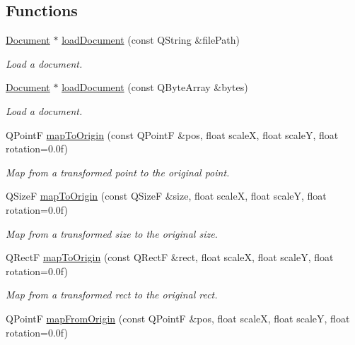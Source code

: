 \subsection*{Functions}
\begin{DoxyCompactItemize}
\item 
\hyperlink{class_mu_p_d_f_1_1_document}{Document} $\ast$ \hyperlink{namespace_mu_p_d_f_a5cf746094bc9648aca0d4a83e3ac44b3}{load\-Document} (const Q\-String \&file\-Path)
\begin{DoxyCompactList}\small\item\em Load a document. \end{DoxyCompactList}\item 
\hyperlink{class_mu_p_d_f_1_1_document}{Document} $\ast$ \hyperlink{namespace_mu_p_d_f_a294a09188a3dcab290679752dfc8d52b}{load\-Document} (const Q\-Byte\-Array \&bytes)
\begin{DoxyCompactList}\small\item\em Load a document. \end{DoxyCompactList}\item 
Q\-Point\-F \hyperlink{namespace_mu_p_d_f_a40833e5e56d0d7d44cba455e4186d5e4}{map\-To\-Origin} (const Q\-Point\-F \&pos, float scale\-X, float scale\-Y, float rotation=0.\-0f)
\begin{DoxyCompactList}\small\item\em Map from a transformed point to the original point. \end{DoxyCompactList}\item 
Q\-Size\-F \hyperlink{namespace_mu_p_d_f_ae91a73bb4e3e4c10eb54c07ab9be9cf7}{map\-To\-Origin} (const Q\-Size\-F \&size, float scale\-X, float scale\-Y, float rotation=0.\-0f)
\begin{DoxyCompactList}\small\item\em Map from a transformed size to the original size. \end{DoxyCompactList}\item 
Q\-Rect\-F \hyperlink{namespace_mu_p_d_f_a2132cae17dab8f9896ec0c83f0c2173c}{map\-To\-Origin} (const Q\-Rect\-F \&rect, float scale\-X, float scale\-Y, float rotation=0.\-0f)
\begin{DoxyCompactList}\small\item\em Map from a transformed rect to the original rect. \end{DoxyCompactList}\item 
Q\-Point\-F \hyperlink{namespace_mu_p_d_f_ad849bcc678dd57c1f12619f9554e6aba}{map\-From\-Origin} (const Q\-Point\-F \&pos, float scale\-X, float scale\-Y, float rotation=0.\-0f)

\end{DoxyCompactItemize}
